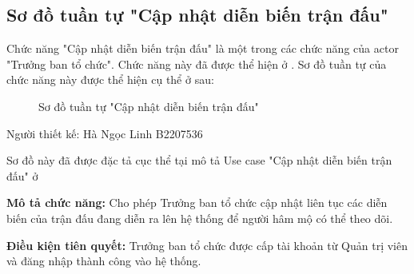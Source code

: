\subsection{Sơ đồ tuần tự "Cập nhật diễn biến trận đấu"}
\setcounter{figure}{0}

Chức năng "Cập nhật diễn biến trận đấu" là một trong các chức năng của actor
"Trưởng ban tổ chức". Chức năng này đã được thể hiện ở .
Sơ đồ tuần tự của chức năng này được thể hiện cụ thể ở  sau:

\begin{figure}[H]
      \centering
      
      \caption{Sơ đồ tuần tự "Cập nhật diễn biến trận đấu"}
      \label{fig:sd-2}
\end{figure}

Người thiết kế: Hà Ngọc Linh B2207536

Sơ đồ này đã được đặc tả cục thể tại mô tả Use case
"Cập nhật diễn biến trận đấu" ở 

\noindent
\textbf{Mô tả chức năng:} Cho phép Trưởng ban tổ chức cập nhật liên tục các diễn biến của trận đấu đang diễn ra lên hệ thống để người hâm mộ có thể theo dõi.

\noindent
\textbf{Điều kiện tiên quyết:} Trưởng ban tổ chức được cấp tài khoản từ Quản trị viên và đăng nhập thành công vào hệ thống.

